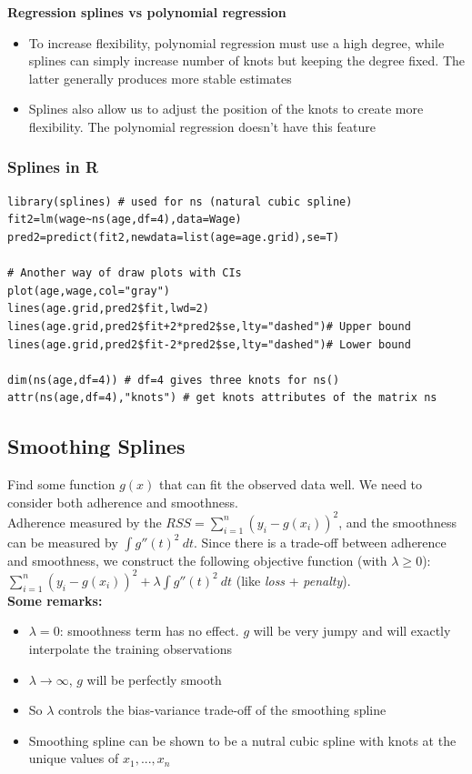 \documentclass[11pt]{article}
\begin{document}
\noindent \textbf{Regression splines vs polynomial regression}
\begin{itemize}
    \item To increase flexibility, polynomial regression must use a high degree, while splines can simply increase number of knots but keeping the degree fixed. The latter generally produces more stable estimates
    \item Splines also allow us to adjust the position of the knots to create more flexibility. The polynomial regression doesn't have this feature
\end{itemize}

\subsubsection{Splines in R}
\begin{lstlisting}
library(splines) # used for ns (natural cubic spline)
fit2=lm(wage~ns(age,df=4),data=Wage)
pred2=predict(fit2,newdata=list(age=age.grid),se=T)

# Another way of draw plots with CIs
plot(age,wage,col="gray")
lines(age.grid,pred2$fit,lwd=2)
lines(age.grid,pred2$fit+2*pred2$se,lty="dashed")# Upper bound
lines(age.grid,pred2$fit-2*pred2$se,lty="dashed")# Lower bound

dim(ns(age,df=4)) # df=4 gives three knots for ns()
attr(ns(age,df=4),"knots") # get knots attributes of the matrix ns
\end{lstlisting}

\subsection{Smoothing Splines}
\noindent Find some function $g(x)$ that can fit the observed data well. We need to consider both adherence and smoothness. \\

\noindent Adherence measured by the $RSS = \sum_{i=1}^{n}{(y_i - g(x_i))^2}$, and the smoothness can be measured by $\int g''(t)^2 \ dt$. Since there is a trade-off between adherence and smoothness, we construct the following objective function (with $\lambda \geq 0$): $\sum_{i=1}^{n}(y_i - g(x_i))^2 + \lambda \int g''(t)^2 \ dt$ (like \textit{loss} + \textit{penalty}). \\

\noindent \textbf{Some remarks:}
\begin{itemize}
    \item $\lambda = 0$: smoothness term has no effect. $g$ will be very jumpy and will exactly interpolate the training observations
    \item $\lambda \rightarrow \infty$, $g$ will be perfectly smooth
    \item So $\lambda$ controls the bias-variance trade-off of the smoothing spline
    \item Smoothing spline can be shown to be a nutral cubic spline with knots at the unique values of $x_1,...,x_n$
\end{itemize} \phantom{i}
\end{document}
